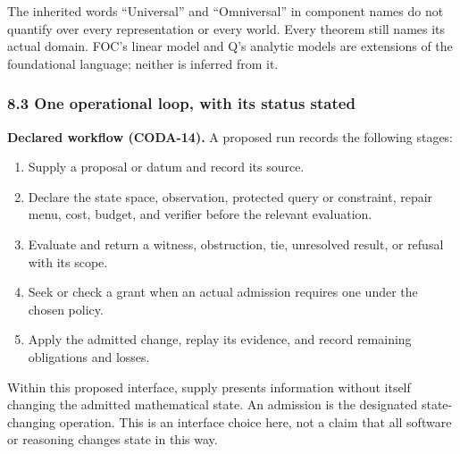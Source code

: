 \documentclass[
  11pt,
]{article}
\providecommand{\tightlist}{%
  \setlength{\itemsep}{0pt}\setlength{\parskip}{0pt}}
\begin{document}
The inherited words ``Universal'' and ``Omniversal'' in component names do not quantify over every representation or every world. Every theorem still names its actual domain. FOC's linear model and Q's analytic models are extensions of the foundational language; neither is inferred from it.

\subsubsection{8.3 One operational loop, with its status stated}\label{one-operational-loop-with-its-status-stated}

\textbf{Declared workflow (CODA-14).} A proposed run records the following stages:

\begin{enumerate}
\def\labelenumi{\arabic{enumi}.}
\tightlist
\item
  Supply a proposal or datum and record its source.
\item
  Declare the state space, observation, protected query or constraint, repair menu, cost, budget, and verifier before the relevant evaluation.
\item
  Evaluate and return a witness, obstruction, tie, unresolved result, or refusal with its scope.
\item
  Seek or check a grant when an actual admission requires one under the chosen policy.
\item
  Apply the admitted change, replay its evidence, and record remaining obligations and losses.
\end{enumerate}

Within this proposed interface, supply presents information without itself changing the admitted mathematical state. An admission is the designated state-changing operation. This is an interface choice here, not a claim that all software or reasoning changes state in this way.
\end{document}
